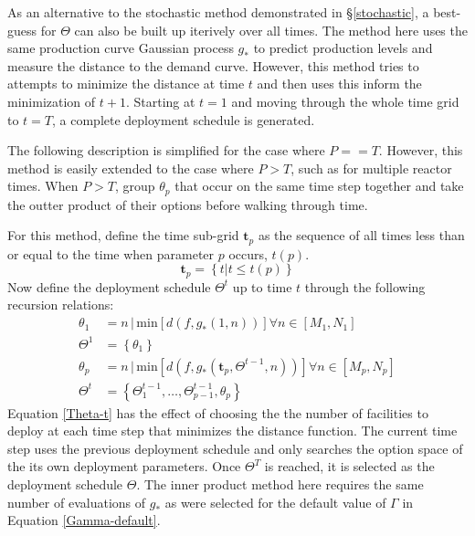 As an alternative to the stochastic method demonstrated in \S\ref{stochastic}, 
a best-guess for $\Theta$ can also be built up iterively over all times.
The method here uses the same production curve Gaussian process $g_*$ to 
predict production levels and measure the distance to the demand curve.
However, this method tries to attempts to minimize the distance at time
$t$ and then uses this inform the minimization of $t+1$. Starting at $t=1$
and moving through the whole time grid to $t=T$, a complete deployment 
schedule is generated.

The following description is simplified for the case where $P==T$. However, 
this method is easily extended to the case where $P > T$, such as for 
multiple reactor times.  When $P > T$, group $\theta_p$ that occur on the 
same time step together and take the outter product of their options before
walking through time.

For this method, define the time sub-grid $\mathbf{t}_p$ as the sequence of
all times less than or equal to the time when parameter $p$ occurs, $t(p)$.
\begin{equation}
\label{t-p}
\mathbf{t}_p = \left\{t | t \le t(p)\right\}
\end{equation}
Now define the deployment schedule $\Theta^t$ up to time $t$ through the
following recursion relations:
\begin{equation}
\label{Theta-t}
\begin{split}
\theta_1 & = n \, | \, \mathrm{min}\left[d(f, g_*(1, n))\right]
                       \forall n\in[M_1, N_1] \\
\Theta^1 & = \left\{\theta_1\right\}\\
\theta_p & = n \, | \, \mathrm{min}\left[d(f, g_*(\mathbf{t}_p, 
                                                  \Theta^{t-1}, n))\right]
                       \forall n\in[M_p, N_p] \\
\Theta^t & = \left\{\Theta_1^{t-1}, \ldots, \Theta_{p-1}^{t-1}, \theta_p\right\}
\end{split}
\end{equation}
Equation \ref{Theta-t} has the effect of choosing the the number of 
facilities to deploy at each time step that minimizes the distance function.
The current time step uses the previous deployment schedule and only searches
the option space of the its own deployment parameters. Once $\Theta^T$ is 
reached, it is selected as the deployment schedule $\Theta$. The inner 
product method here requires the same number of evaluations of $g_*$ as 
were selected for the default value of $\Gamma$ in Equation 
\ref{Gamma-default}.



